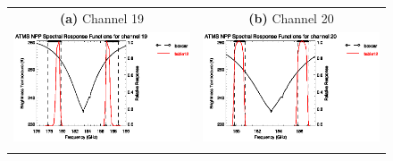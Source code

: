 \begin{figure}[H]
  \centering
  \begin{tabular}{c c}
    \textsf{\textbf{(a)} Channel 19} &
    \textsf{\textbf{(b)} Channel 20} \\
    \includegraphics[bb=70 400 300 559,clip,scale=1.0]{graphics/srf/table12/atms_npp.ch19.osrf.eps} &
    \includegraphics[bb=70 400 300 559,clip,scale=1.0]{graphics/srf/table12/atms_npp.ch20.osrf.eps} \\\\


\end{tabular}
\end{figure}
